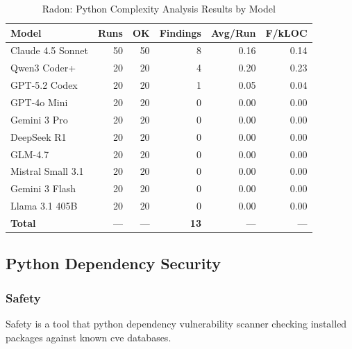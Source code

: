 \begin{table}[htbp]
    \centering
    \caption{Radon: Python Complexity Analysis Results by Model}
    \label{tab:tool_radon}
    \small
    \begin{tabular}{@{} l r r r r r @{}}
        \toprule
        \textbf{Model} & \textbf{Runs} & \textbf{OK} & \textbf{Findings} & \textbf{Avg/Run} & \textbf{F/kLOC} \\
        \midrule
        Claude 4.5 Sonnet & 50 & 50 & 8 & 0.16 & 0.14 \\
        Qwen3 Coder+ & 20 & 20 & 4 & 0.20 & 0.23 \\
        GPT-5.2 Codex & 20 & 20 & 1 & 0.05 & 0.04 \\
        GPT-4o Mini & 20 & 20 & 0 & 0.00 & 0.00 \\
        Gemini 3 Pro & 20 & 20 & 0 & 0.00 & 0.00 \\
        DeepSeek R1 & 20 & 20 & 0 & 0.00 & 0.00 \\
        GLM-4.7 & 20 & 20 & 0 & 0.00 & 0.00 \\
        Mistral Small 3.1 & 20 & 20 & 0 & 0.00 & 0.00 \\
        Gemini 3 Flash & 20 & 20 & 0 & 0.00 & 0.00 \\
        Llama 3.1 405B & 20 & 20 & 0 & 0.00 & 0.00 \\
        \midrule
        \textbf{Total} & --- & --- & \textbf{13} & --- & --- \\
        \bottomrule
    \end{tabular}
\end{table}

\subsection{Python Dependency Security}

\subsubsection{Safety}

Safety is a tool that python dependency vulnerability scanner checking installed packages against known cve databases.

